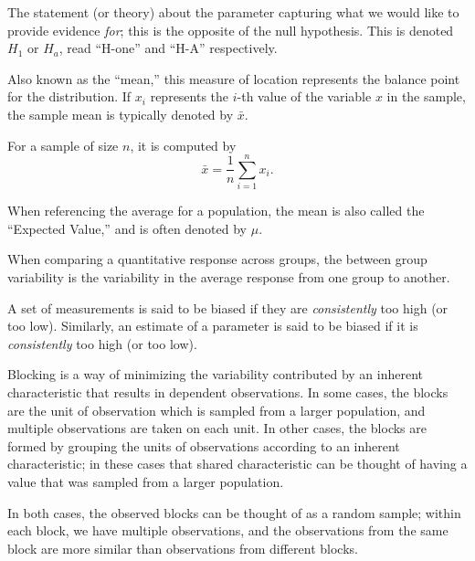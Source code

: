 \documentclass[
  letterpaper,
  DIV=11,
  numbers=noendperiod]{scrreprt}
\providecommand{\tightlist}{%
  \setlength{\itemsep}{0pt}\setlength{\parskip}{0pt}}\usepackage{longtable,booktabs,array}
\theoremstyle{plain}
\theoremstyle{definition}
\theoremstyle{definition}
\theoremstyle{remark}
\begin{document}
\begin{description}
\tightlist
\item[Alternative Hypothesis
(Definition~\ref{def-alternative-hypothesis})]
The statement (or theory) about the parameter capturing what we would
like to provide evidence \emph{for}; this is the opposite of the null
hypothesis. This is denoted \(H_1\) or \(H_a\), read ``H-one'' and
``H-A'' respectively.
\item[Average (Definition~\ref{def-average})]
Also known as the ``mean,'' this measure of location represents the
balance point for the distribution. If \(x_i\) represents the \(i\)-th
value of the variable \(x\) in the sample, the sample mean is typically
denoted by \(\bar{x}\).
\end{description}

For a sample of size \(n\), it is computed by
\[\bar{x} = \frac{1}{n}\sum_{i=1}^{n} x_i.\]

When referencing the average for a population, the mean is also called
the ``Expected Value,'' and is often denoted by \(\mu\).

\begin{description}
\tightlist
\item[Between Group Variability
(Definition~\ref{def-between-group-variability})]
When comparing a quantitative response across groups, the between group
variability is the variability in the average response from one group to
another.
\item[Bias (Definition~\ref{def-bias})]
A set of measurements is said to be biased if they are
\emph{consistently} too high (or too low). Similarly, an estimate of a
parameter is said to be biased if it is \emph{consistently} too high (or
too low).
\item[Blocking (Definition~\ref{def-blocking})]
Blocking is a way of minimizing the variability contributed by an
inherent characteristic that results in dependent observations. In some
cases, the blocks are the unit of observation which is sampled from a
larger population, and multiple observations are taken on each unit. In
other cases, the blocks are formed by grouping the units of observations
according to an inherent characteristic; in these cases that shared
characteristic can be thought of having a value that was sampled from a
larger population.
\end{description}

In both cases, the observed blocks can be thought of as a random sample;
within each block, we have multiple observations, and the observations
from the same block are more similar than observations from different
blocks.
\end{document}
